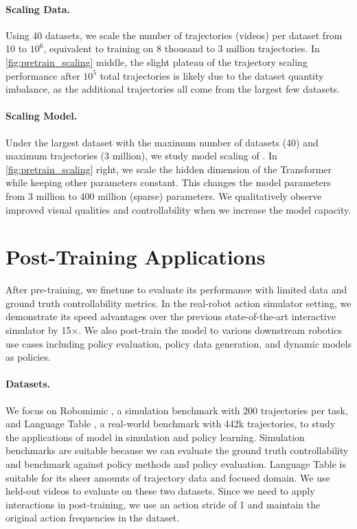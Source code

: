 \paragraph{Scaling Data.} Using 40 datasets, we scale the number of trajectories (videos) per dataset from 10 to $10^6$, equivalent to training on 8 thousand to 3 million trajectories. In  \cref{fig:pretrain_scaling} middle, the slight plateau of the trajectory scaling performance after $10^5$ total trajectories is likely due to the dataset quantity imbalance, as the additional trajectories all come from the largest few datasets. 

\paragraph{Scaling Model.} Under the largest dataset with the maximum number of datasets (40) and maximum trajectories (3 million), we study model scaling of \ourshort. In  \cref{fig:pretrain_scaling} right, we scale the hidden dimension of the Transformer while keeping other parameters constant. This changes the model parameters from 3 million to 400 million (sparse) parameters. We qualitatively observe improved visual qualities and controllability when we increase the model capacity.


\section{Post-Training Applications\label{sec:post}}


After pre-training, we finetune \ourshort to evaluate its performance with limited data and ground truth controllability metrics. In the real-robot action simulator setting,  we demonstrate its speed advantages over the previous state-of-the-art interactive simulator by 15$\times$. We also post-train the model to various downstream robotics use cases including policy evaluation, policy data generation, and dynamic models as policies.

\paragraph{Datasets.} We focus on Robomimic \cite{robomimic2021}, a simulation benchmark with 200 trajectories per task, and Language Table \cite{lynch2023interactive}, a real-world benchmark with 442k trajectories, to study the applications of \ourshort model in simulation and policy learning. Simulation benchmarks are suitable because we can evaluate the ground truth controllability and benchmark against policy methods and policy evaluation. Language Table is suitable for its sheer amounts of trajectory data and focused domain. We use held-out videos to evaluate \ourshort on these two datasets. Since we need to apply interactions in post-training, we use an action stride of 1 and maintain the original action frequencies in the dataset.

